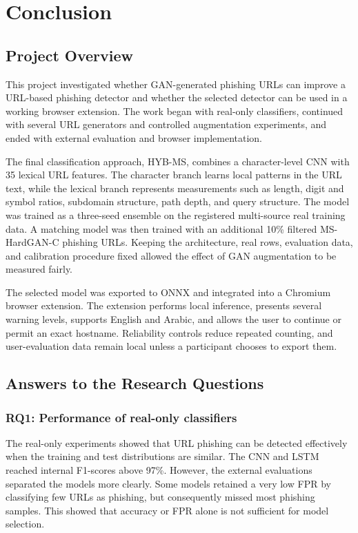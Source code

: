 \chapter{Conclusion}
\label{chap:conclusion}

\section{Project Overview}

This project investigated whether GAN-generated phishing URLs can improve a
URL-based phishing detector and whether the selected detector can be used in a
working browser extension. The work began with real-only classifiers, continued
with several URL generators and controlled augmentation experiments, and ended
with external evaluation and browser implementation.

The final classification approach, HYB-MS, combines a character-level CNN with
35 lexical URL features. The character branch learns local patterns in the URL
text, while the lexical branch represents measurements such as length, digit
and symbol ratios, subdomain structure, path depth, and query structure. The
model was trained as a three-seed ensemble on the registered multi-source real
training data. A matching model was then trained with an additional 10\%
filtered MS-HardGAN-C phishing URLs. Keeping the architecture, real rows,
evaluation data, and calibration procedure fixed allowed the effect of GAN
augmentation to be measured fairly.

The selected model was exported to ONNX and integrated into a Chromium browser
extension. The extension performs local inference, presents several warning
levels, supports English and Arabic, and allows the user to continue or permit
an exact hostname. Reliability controls reduce repeated counting, and
user-evaluation data remain local unless a participant chooses to export them.

\section{Answers to the Research Questions}

\subsection{RQ1: Performance of real-only classifiers}

The real-only experiments showed that URL phishing can be detected effectively
when the training and test distributions are similar. The CNN and LSTM reached
internal F1-scores above 97\%. However, the external evaluations separated the
models more clearly. Some models retained a very low FPR by classifying few
URLs as phishing, but consequently missed most phishing samples. This showed
that accuracy or FPR alone is not sufficient for model selection.

